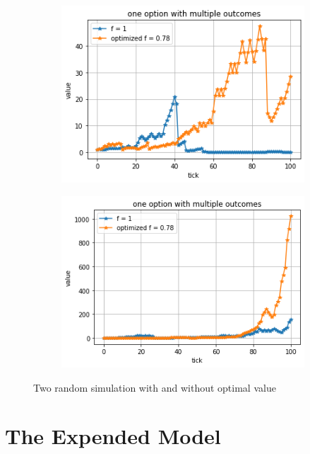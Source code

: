 \documentclass{article}
\begin{document}
	\begin{figure}[h]
		\begin{subfigure}{0.525\textwidth}
			\includegraphics[width=0.9\linewidth]{single1} 
			\label{fig:subim1}
		\end{subfigure}
		\begin{subfigure}{0.525\textwidth}
			\includegraphics[width=0.9\linewidth]{single2}
			\label{fig:subim2}
		\end{subfigure}
		\caption{Two random simulation with and without optimal value}
		\label{Fig:single1}
	\end{figure}
	
	
	\newpage
	\section{The Expended Model}
\end{document}
